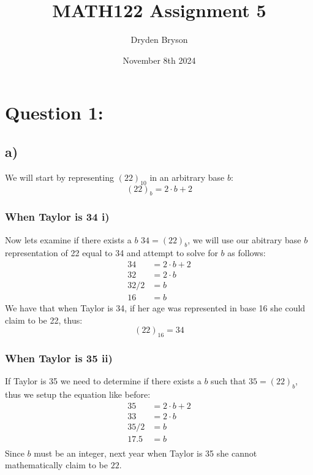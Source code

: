 \documentclass{article}
\title{MATH122 Assignment 5}
\author{Dryden Bryson}
\date{November 8th 2024}
\begin{document}
\maketitle
\newpage
\section*{Question 1:}
\subsection*{a)}
We will start by representing $(22)_{10}$ in an arbitrary base 
$b$: $$(22)_{b}=2\cdot b+2$$
\subsubsection*{When Taylor is 34\;\; i)}
Now lets examine if there exists a $b$ $34=(22)_{b}$, we will use our abitrary base $b$ representation of 22 equal to 34 and attempt to solve for $b$ as follows:
$$\begin{aligned}
    34&=2\cdot b+2\\
    32&=2\cdot b\\
    32/2&=b\\
    16&=b
\end{aligned}$$
We have that when Taylor is 34, if her age was represented in base 16 she could claim to be 22, thus: $$(22)_{16}=34$$ 
\subsubsection*{When Taylor is 35\;\; ii)}
If Taylor is 35 we need to determine if there exists a $b$ such that $35 = (22)_{b}$, thus we setup the equation like before:
$$\begin{aligned}
    35&=2\cdot b+2\\
    33&=2\cdot b\\
    35/2&=b\\
    17.5&=b\\
\end{aligned}$$
Since $b$ must be an integer, next year when Taylor is 35 she cannot mathematically claim to be $22$.
\end{document}
